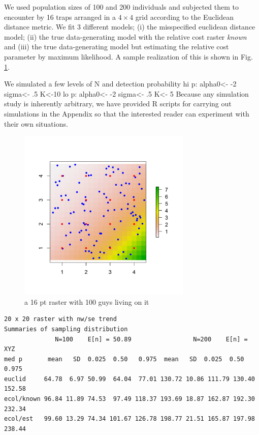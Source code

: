\documentclass[12pt]{article}
\begin{document}
We used population sizes of 100 and 200 individuals and subjected them
to encounter by 16 traps arranged in a $4\times 4$ grid according to
the Euclidean distance metric. We fit 3 different models; (i) the
misspecified euclidean distance model; (ii) the true data-generating
model with the relative cost raster {\it known} and (iii) the true
data-generating model but estimating the relative cost parameter by
maximum likelihood.  A sample realization of this is shown in Fig.
\ref{ecoldist.fig.raster100}.

We simulated a few levels of N and detection probability 
hi p: alpha0<- -2     sigma<- .5    K<-10
lo p: alpha0<- -2     sigma<- .5    K<- 5
Because any simulation study is inherently arbitrary, we have provided R scripts
for carrying out simulations in the Appendix so that the interested reader can experiment with
their own situations.

\begin{figure}
\begin{center}
\includegraphics[height=3.25in,width=3.25in]{figs/raster_withN100}
\end{center}
\caption{a 16 pt raster with 100 guys living on it}
\label{ecoldist.fig.raster100}
\end{figure}
 


\begin{verbatim}
20 x 20 raster with nw/se trend
Summaries of sampling distribution
              N=100    E[n] = 50.89                 N=200    E[n] = XYZ
med p       mean   SD  0.025  0.50   0.975  mean   SD  0.025  0.50   0.975
euclid     64.78  6.97 50.99  64.04  77.01 130.72 10.86 111.79 130.40 152.58
ecol/known 96.84 11.89 74.53  97.49 118.37 193.69 18.87 162.87 192.30 232.34
ecol/est   99.60 13.29 74.34 101.67 126.78 198.77 21.51 165.87 197.98 238.44
\end{verbatim}
\end{document}

